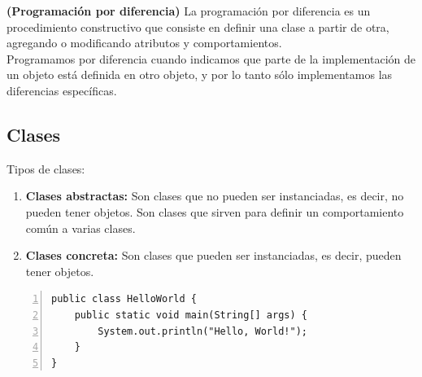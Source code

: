 \documentclass[../main.tex]{subfiles}
\begin{document}
        \begin{definition} \textbf{(Programación por diferencia)}
            La programación por diferencia es un procedimiento constructivo que consiste en definir una clase a partir de otra, agregando o modificando atributos y comportamientos.\\

            Programamos por diferencia cuando indicamos que parte de la implementación de un objeto está definida en otro objeto, y por lo tanto sólo implementamos las diferencias específicas.
        \end{definition}

    \subsection{Clases}
        Tipos de clases:
        \begin{enumerate}
            \item \textbf{Clases abstractas:} Son clases que no pueden ser instanciadas, es decir, no pueden tener objetos. Son clases que sirven para definir un comportamiento común a varias clases.
            \item \textbf{Clases concreta:} Son clases que pueden ser instanciadas, es decir, pueden tener objetos.
        \end{enumerate}


        \begin{lstlisting}[style=Java, frame=single, caption=Clase abstracta, numbers=left]
public class HelloWorld {
    public static void main(String[] args) {
        System.out.println("Hello, World!");
    }
}
        \end{lstlisting}
\end{document}
